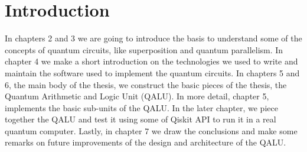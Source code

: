 \chapter{Introduction}
In chapters 2 and 3 we are going to introduce the basis to understand some of the concepts
of quantum circuits, like superposition and quantum parallelism. In chapter 4 we make a
short introduction on the technologies we used to write and maintain the software used
to implement the quantum circuits. In chapters 5 and 6, the main body of the thesis,
we construct the basic pieces of the thesis, the Quantum Arithmetic and Logic Unit (QALU). In
more detail, chapter 5, implements the basic sub-units of the QALU. In the later chapter,
we piece together the QALU and test it using some of Qiskit API to run it in a real
quantum computer. Lastly, in chapter 7 we draw the conclusions and make some remarks on
future improvements of the design and architecture of the QALU.